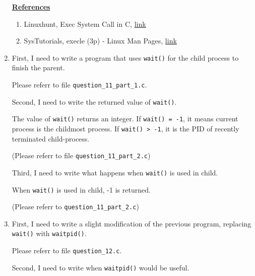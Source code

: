 \documentclass[12pt]{article}
\begin{document}
\begin{enumerate}[1.]
    \bigskip

    \underline{\textbf{References}}

    \begin{enumerate}[1)]
        \item Linuxhunt, Exec System Call in C, \href{https://linuxhint.com/exec_linux_system_call_c/}{link}
        \item SysTutorials, execle (3p) - Linux Man Pages, \href{https://www.systutorials.com/docs/linux/man/3p-execle/}{link}
    \end{enumerate}

    \item

    First, I need to write a program that uses \texttt{wait()} for the child process
    to finish the parent.

    \bigskip

    Please referr to file \texttt{question\_11\_part\_1.c}.

    \bigskip

    Second, I need to write the returned value of \texttt{wait()}.

    \bigskip

    The value of \texttt{wait()} returns an integer. If \texttt{wait() = -1}, it means
    current process is the childmost process. If \texttt{wait() > -1}, it is the PID
    of recently terminated child-process.

    \bigskip

    (Please referr to file \texttt{question\_11\_part\_2.c})

    \bigskip

    Third, I need to write what happens when \texttt{wait()} is used in child.

    \bigskip

    When \texttt{wait()} is used in child, -1 is returned.

    \bigskip

    (Please referr to \texttt{question\_11\_part\_2.c})

    \item

    First, I need to write a slight modification of the previous program, replacing
    \texttt{wait()} with \texttt{waitpid()}.

    \bigskip

    Please referr to file \texttt{question\_12.c}.

    \bigskip

    Second, I need to write when \texttt{waitpid()} would be useful.


\end{enumerate}
\end{document}
